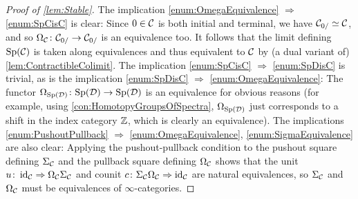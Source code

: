 \begin{proof}[Proof of \cref{lem:Stable}]
	The implication \cref{enum:OmegaEquivalence} $\Rightarrow$ \cref{enum:SpCisC} is clear: Since $0\in\mathcal{C}$ is both initial and terminal, we have $\mathcal{C}_{0/}\simeq \mathcal{C}$, and so $\Omega_{\mathcal{C}}\colon \mathcal{C}_{0/}\rightarrow \mathcal{C}_{0/}$ is an equivalence too. It follows that the limit defining $\mathrm{Sp}(\mathcal{C})$ is taken along equivalences and thus equivalent to $\mathcal{C}$ by (a dual variant of) \cref{lem:ContractibleColimit}. The implication \cref{enum:SpCisC} $\Rightarrow$ \cref{enum:SpDisC} is trivial, as is the implication \cref{enum:SpDisC} $\Rightarrow$ \cref{enum:OmegaEquivalence}: The functor $\Omega_{\mathrm{Sp}(\mathcal{D})}\colon \mathrm{Sp}(\mathcal{D})\rightarrow \mathrm{Sp}(\mathcal{D})$ is an equivalence for obvious reasons (for example, using \cref{con:HomotopyGroupsOfSpectra}, $\Omega_{\mathrm{Sp}(\mathcal{D})}$ just corresponds to a shift in the index category $\mathbb{Z}$, which is clearly an equivalence). The implications \cref{enum:PushoutPullback} $\Rightarrow $ \cref{enum:OmegaEquivalence}, \cref{enum:SigmaEquivalence} are also clear: Applying the pushout-pullback condition to the pushout square defining $\Sigma_{\mathcal{C}}$ and the pullback square defining $\Omega_{\mathcal{C}}$ shows that the unit $u\colon\operatorname{id}_{\mathcal{C}}\Rightarrow\Omega_{\mathcal{C}}\Sigma_{\mathcal{C}}$ and counit $c\colon \Sigma_{\mathcal{C}}\Omega_{\mathcal{C}}\Rightarrow\operatorname{id}_{\mathcal{C}}$ are natural equivalences, so $\Sigma_{\mathcal{C}}$ and $\Omega_{\mathcal{C}}$ must be equivalences of $\infty$-categories.
	

\end{proof}
